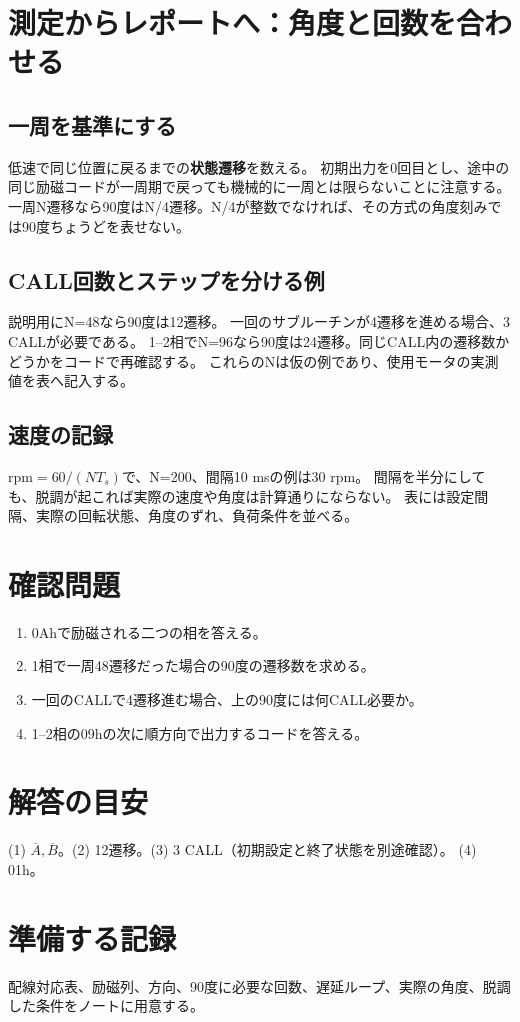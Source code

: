 \documentclass[lualatex,a4paper,10pt]{jlreq}
\begin{document}
\section{測定からレポートへ：角度と回数を合わせる}\label{sec:auto7}
\subsection{一周を基準にする}
低速で同じ位置に戻るまでの\textbf{状態遷移}を数える。
初期出力を0回目とし、途中の同じ励磁コードが一周期で戻っても機械的に一周とは限らないことに注意する。
一周N遷移なら90度はN/4遷移。N/4が整数でなければ、その方式の角度刻みでは90度ちょうどを表せない。
\subsection{CALL回数とステップを分ける例}
説明用にN=48なら90度は12遷移。
一回のサブルーチンが4遷移を進める場合、3 CALLが必要である。
1--2相でN=96なら90度は24遷移。同じCALL内の遷移数かどうかをコードで再確認する。
これらのNは仮の例であり、使用モータの実測値を表へ記入する。
\subsection{速度の記録}
$\mathrm{rpm}=60/(NT_s)$で、N=200、間隔10 msの例は30 rpm。
間隔を半分にしても、脱調が起これば実際の速度や角度は計算通りにならない。
表には設定間隔、実際の回転状態、角度のずれ、負荷条件を並べる。

\clearpage
\section{確認問題}\label{sec:auto8}
\begin{enumerate}
\item 0Ahで励磁される二つの相を答える。\answerline
\item 1相で一周48遷移だった場合の90度の遷移数を求める。\answerline
\item 一回のCALLで4遷移進む場合、上の90度には何CALL必要か。\answerline
\item 1--2相の09hの次に順方向で出力するコードを答える。\answerline
\end{enumerate}
\section*{解答の目安}\label{sec:auto9}
(1) $\overline A,\overline B$。(2) 12遷移。(3) 3 CALL（初期設定と終了状態を別途確認）。
(4) 01h。
\section*{準備する記録}\label{sec:auto10}
配線対応表、励磁列、方向、90度に必要な回数、遅延ループ、実際の角度、脱調した条件をノートに用意する。
\prelabclosing
\end{document}
